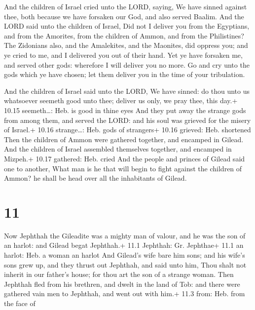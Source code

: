  And the children of Israel cried unto the LORD, saying,
We have sinned against thee, both because we have forsaken our God, and
also served Baalim.  And the LORD said unto the children of
Israel, Did not I deliver you from the Egyptians, and from the Amorites,
from the children of Ammon, and from the Philistines?  The
Zidonians also, and the Amalekites, and the Maonites, did oppress you;
and ye cried to me, and I delivered you out of their hand. 
Yet ye have forsaken me, and served other gods: wherefore I will deliver
you no more.  Go and cry unto the gods which ye have
chosen; let them deliver you in the time of your tribulation.

 And the children of Israel said unto the LORD, We have
sinned: do thou unto us whatsoever seemeth good unto thee; deliver us
only, we pray thee, this day.+ 10.15 seemeth\ldots: Heb. is good in
thine eyes  And they put away the strange gods from among
them, and served the LORD: and his soul was grieved for the misery of
Israel.+ 10.16 strange\ldots: Heb. gods of strangers+ 10.16 grieved:
Heb. shortened  Then the children of Ammon were gathered
together, and encamped in Gilead. And the children of Israel assembled
themselves together, and encamped in Mizpeh.+ 10.17 gathered: Heb. cried
 And the people and princes of Gilead said one to another,
What man is he that will begin to fight against the children of Ammon?
he shall be head over all the inhabitants of Gilead.

\hypertarget{section-10}{%
\section{11}\label{section-10}}

 Now Jephthah the Gileadite was a mighty man of valour, and
he was the son of an harlot: and Gilead begat Jephthah.+ 11.1 Jephthah:
Gr. Jephthae+ 11.1 an harlot: Heb. a woman an harlot  And
Gilead's wife bare him sons; and his wife's sons grew up, and they
thrust out Jephthah, and said unto him, Thou shalt not inherit in our
father's house; for thou art the son of a strange woman. 
Then Jephthah fled from his brethren, and dwelt in the land of Tob: and
there were gathered vain men to Jephthah, and went out with him.+ 11.3
from: Heb. from the face of

